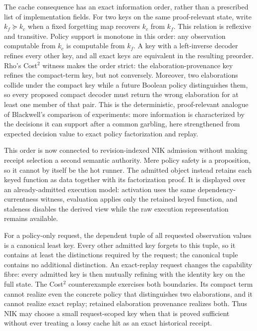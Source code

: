 \documentclass[11pt]{article}
\begin{document}
The cache consequence has an exact information order, rather than a prescribed
list of implementation fields.  For two keys on the same proof-relevant state,
write $k_f \succeq k_c$ when a fixed forgetting map recovers $k_c$ from $k_f$.
This relation is reflexive and transitive.  Policy support is monotone in this
order: any observation computable from $k_c$ is computable from $k_f$.  A key
with a left-inverse decoder refines every other key, and all exact keys are
equivalent in the resulting preorder.  Rho's Cost$^2$ witness makes the order
strict: the elaboration-provenance key refines the compact-term key, but not
conversely.  Moreover, two elaborations collide under the compact key while a
future Boolean policy distinguishes them, so every proposed compact decoder
must return the wrong elaboration for at least one member of that pair.  This is
the deterministic, proof-relevant analogue of Blackwell's comparison of
experiments: more information is characterized by the decisions it can support
after a common garbling, here strengthened from expected decision value to
exact policy factorization and replay.

This order is now connected to revision-indexed NIK admission without making
receipt selection a second semantic authority.  Mere policy safety is a
proposition, so it cannot by itself be the hot runner.  The admitted object
instead retains each keyed function as data together with its factorization
proof.  It is displayed over an already-admitted execution model: activation
uses the same dependency-currentness witness, evaluation applies only the
retained keyed function, and staleness disables the derived view while the raw
execution representation remains available.

For a policy-only request, the dependent tuple of all requested observation
values is a canonical least key.  Every other admitted key forgets to this
tuple, so it contains at least the distinctions required by the request; the
canonical tuple contains no additional distinction.  An exact-replay request
changes the capability fibre: every admitted key is then mutually refining
with the identity key on the full state.  The Cost$^2$ counterexample exercises
both boundaries.  Its compact term cannot realize even the concrete policy
that distinguishes two elaborations, and it cannot realize exact replay;
retained elaboration provenance realizes both.  Thus NIK may choose a small
request-scoped key when that is proved sufficient without ever treating a
lossy cache hit as an exact historical receipt.
\end{document}
